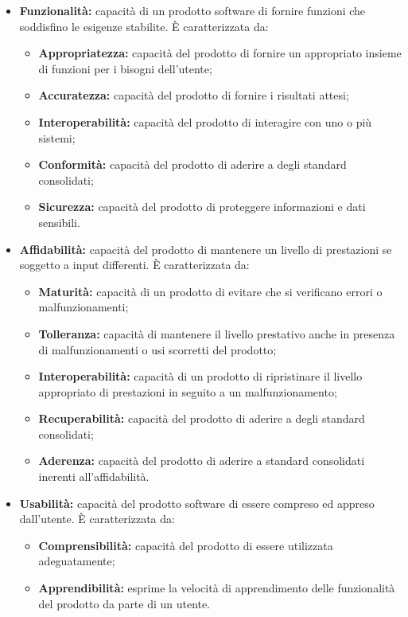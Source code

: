 \begin{itemize}
	\item \textbf{Funzionalità:} capacità di un prodotto software di fornire funzioni che soddisfino le esigenze stabilite. È caratterizzata da:
	\begin{itemize}
		\item \textbf{Appropriatezza:} capacità del prodotto di fornire un appropriato insieme di funzioni per i bisogni dell'utente;
		\item \textbf{Accuratezza:} capacità del prodotto di fornire i risultati attesi;
		\item \textbf{Interoperabilità:} capacità del prodotto di interagire con uno o più sistemi;
		\item \textbf{Conformità:} capacità del prodotto di aderire a degli standard consolidati;
		\item \textbf{Sicurezza:} capacità del prodotto di proteggere informazioni e dati sensibili.
	\end{itemize}
	\item \textbf{Affidabilità:} capacità del prodotto di mantenere un livello di prestazioni se soggetto a input differenti. È caratterizzata da:
	\begin{itemize}
		\item \textbf{Maturità:} capacità di un prodotto di evitare che si verificano errori o malfunzionamenti;
		\item \textbf{Tolleranza:} capacità di mantenere il livello prestativo anche in presenza di malfunzionamenti o usi scorretti del prodotto;
		\item \textbf{Interoperabilità:} capacità di un prodotto di ripristinare il livello appropriato di prestazioni in seguito a un malfunzionamento;
		\item \textbf{Recuperabilità:} capacità del prodotto di aderire a degli standard consolidati;
		\item \textbf{Aderenza:} capacità del prodotto di aderire a standard consolidati inerenti all'affidabilità.
	\end{itemize}
	\item \textbf{Usabilità:} capacità del prodotto software di essere compreso ed appreso dall'utente. È caratterizzata da:
	\begin{itemize}
		\item \textbf{Comprensibilità:} capacità del prodotto di essere utilizzata adeguatamente;
		\item \textbf{Apprendibilità:} esprime la velocità di apprendimento delle funzionalità del prodotto da parte di un utente.

\end{itemize}
\end{itemize}
